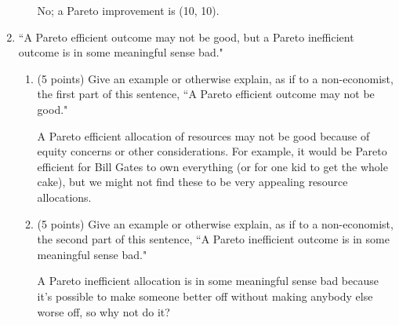 \documentclass[twoside]{article}
\newcommand{\mybigskip}{\vspace{1in}}
\begin{document}
\begin{enumerate}
\begin{enumerate}
\begin{KEY}
No; a Pareto improvement is (10, 10).
\end{KEY}

    \end{enumerate}









\item \begin{EXAM} ``A Pareto efficient outcome may not be good, but a Pareto inefficient outcome is in some meaningful sense bad."\end{EXAM}

    \begin{enumerate}
    \item \begin{EXAM} (5 points) Give an example or otherwise explain, as if to a non-economist, the first part of this sentence, ``A Pareto efficient outcome may not be good." \vspace{1.7in}\end{EXAM}

\begin{KEY}
A Pareto efficient allocation of resources may not be good because of equity concerns or other considerations. For example, it would be Pareto efficient for Bill Gates to own everything (or for one kid to get the whole cake), but we might not find these to be very appealing resource allocations.
\end{KEY}


    \item \begin{EXAM} (5 points) Give an example or otherwise explain, as if to a non-economist, the second part of this sentence, ``A Pareto inefficient outcome is in some meaningful sense bad." \vspace{1.7in}\end{EXAM}

\begin{KEY}
A Pareto inefficient allocation is in some meaningful sense bad because it's possible to make someone better off without making anybody else worse off, so why not do it?
\end{KEY}

    \end{enumerate}












\end{enumerate}
\end{document}
